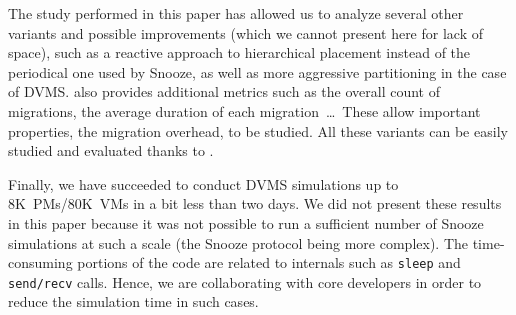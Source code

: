 The study performed in this paper has allowed us to analyze several
other variants and possible improvements (which we cannot present here
for lack of space), such as a reactive approach to hierarchical
placement instead of the periodical one used by Snooze, as well as
more aggressive partitioning in the case of DVMS.  \vmps also provides
additional metrics such as the overall count of migrations, the
average duration of each migration~\ldots\ These allow important
properties, \eg the migration overhead, to be studied. All these
variants can be easily studied and evaluated thanks to \vmps.

Finally, we have succeeded to conduct DVMS simulations up to
8K~PMs/80K~VMs in a bit less than two days. We did not present these
results in this paper because it was not possible to run a sufficient
number of Snooze simulations at such a scale (the Snooze protocol
being more complex).
The time-consuming portions of the code are related to \sg internals
such as \texttt{sleep} and \texttt{send/recv} calls. Hence, we are
collaborating with \sg core developers in order to reduce the
simulation time in such cases.


